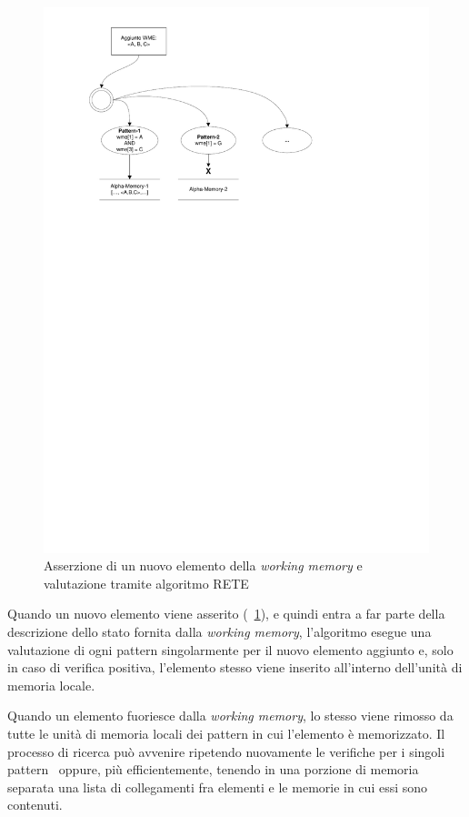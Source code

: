 \begin{figure}[h]
\centering
\includegraphics[viewport=70 545 416 812]{Immagini/Capitolo1/Asserzione.pdf}
\caption{Asserzione di un nuovo elemento della \emph{working memory} e valutazione tramite algoritmo RETE}\label{fig:asserzione}
\end{figure}

Quando un nuovo elemento viene asserito (\figurename~\ref{fig:asserzione}), e quindi entra a far parte della descrizione dello stato fornita dalla \emph{working memory}, l'algoritmo esegue una valutazione di ogni pattern singolarmente per il nuovo elemento aggiunto e, solo in caso di verifica positiva, l'elemento stesso viene inserito all'interno dell'unità di memoria locale.~\cite{forgy1982}

Quando un elemento fuoriesce dalla \emph{working memory}, lo stesso viene rimosso da tutte le unità di memoria locali dei pattern in cui l'elemento è memorizzato. Il processo di ricerca può avvenire ripetendo nuovamente le verifiche per i singoli pattern~\cite{forgy1982} oppure, più efficientemente, tenendo in una porzione di memoria separata una lista di collegamenti fra elementi e le memorie in cui essi sono contenuti.~\cite{Doorenbos95productionmatching}

